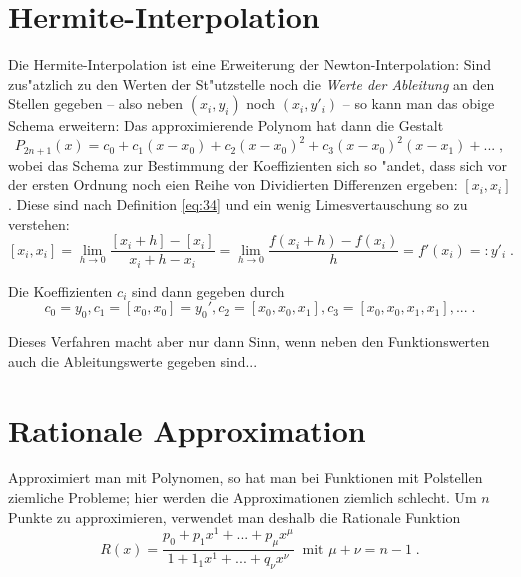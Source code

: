 \documentclass[a4paper]{book}
\begin{document}
\section{Hermite-Interpolation}
\label{sec:hermite_interpolation}

Die Hermite-Interpolation ist eine Erweiterung der
Newton-Interpolation: Sind zus"atzlich zu den Werten der St"utzstelle
noch die \emph{Werte der Ableitung} an den Stellen gegeben -- also
neben $(x_i, y_i)$ noch $(x_i, y'_i)$ -- so kann man das obige Schema
erweitern: Das approximierende Polynom hat dann die Gestalt
\begin{equation}
  \label{eq:36}
  P_{2n+1}(x) = c_0 + c_1(x-x_0) + c_2 (x-x_0)^2 + c_3(x-x_0)^2(x-x_1)
  + ... \;,
\end{equation}
wobei das Schema zur Bestimmung der Koeffizienten sich so "andet, dass
sich vor der ersten Ordnung noch eien Reihe von Dividierten
Differenzen ergeben: $[x_i, x_i]$. Diese sind nach Definition
\eqref{eq:34} und ein
wenig Limesvertauschung so zu verstehen:
\begin{equation}
  \label{eq:35}
  [x_i, x_i] = \lim_{h\to 0}\frac{[x_i +h] - [x_i]}{x_i+h-x_i} =
  \lim_{h\to 0}\frac{f(x_i+h)-f(x_i)}{h} = f'(x_i) =: y'_i \;.
\end{equation}

Die Koeffizienten $c_i$ sind dann gegeben durch
\begin{equation}
  \label{eq:37}
  c_0 = y_0, c_1  = [x_0, x_0] = y_0', c_2 = [x_0,x_0,x_1], c_3 =
  [x_0,x_0,x_1,x_1], ... \;.
\end{equation}

Dieses Verfahren macht aber nur dann Sinn, wenn neben den
Funktionswerten auch die Ableitungswerte gegeben sind...






\section{Rationale Approximation}
\label{sec:rationale_approximation}

Approximiert man mit Polynomen, so hat man bei Funktionen mit
Polstellen ziemliche Probleme; hier werden die Approximationen
ziemlich schlecht. Um $n$ Punkte zu approximieren, verwendet man
deshalb die Rationale Funktion
\begin{equation}
  \label{eq:96}
  R(x) = \frac{p_0 + p_1 x^1 + ... + p_\mu x^\mu}{1 + 1_1 x^1 + ... +
    q_\nu x^\nu} ~ \text{ mit } \mu + \nu = n-1 \;.
\end{equation}
\end{document}
